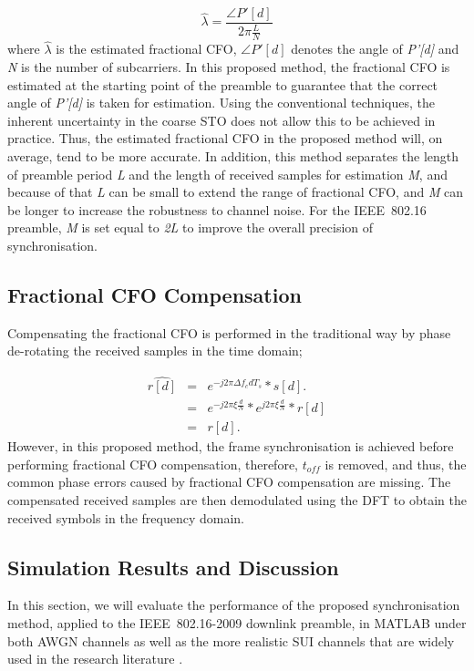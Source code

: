 \begin{equation}
\label{proposedfractionalCFO}
\hat{\lambda} = \frac{\angle P'[d]}{2\pi \frac{L}{N}}
\end{equation}
where $\hat{\lambda}$ is the estimated fractional CFO, $\angle P'[d]$ denotes the angle of \emph{P'[d]} and \emph{N} is the number of subcarriers.
In this proposed method, the fractional CFO is estimated at the starting point of the preamble to guarantee that the correct angle of \emph{P'[d]} is taken for estimation. Using the conventional techniques, the inherent uncertainty in the coarse STO does not allow this to be achieved in practice.
Thus, the estimated fractional CFO in the proposed method will, on average, tend to be more accurate.
In addition, this method separates the length of preamble period \emph{L} and the length of received samples for estimation \emph{M}, and because of that \emph{L} can be small to extend the range of fractional CFO, and \emph{M} can be longer to increase the robustness to channel noise. For the IEEE~802.16 preamble, \emph{M} is set equal to \emph{2L} to improve the overall precision of synchronisation.

\subsection{Fractional CFO Compensation} 

Compensating the fractional CFO is performed in the traditional way by phase de-rotating the received samples in the time domain;

\begin{eqnarray}
\label{proposedcomfreoffsignal}
\widehat{r[d]} &=&  e^{-j2\pi\Delta f_{c}dT_{s}}*s[d]. \nonumber \\
&=&  e^{-j2\pi\xi \frac{d}{N}}*e^{j2\pi\xi \frac{d}{N}}*r[d] \nonumber \\
&=& r[d].
\end{eqnarray}
However, in this proposed method, the frame synchronisation is achieved before performing fractional CFO compensation, therefore, $t_{off}$ is removed, and thus, the common phase errors caused by fractional CFO compensation are missing. 
The compensated received samples are then demodulated using the DFT to obtain the received symbols in the frequency domain.

\subsection{Simulation Results and Discussion}
In this section, we will evaluate the performance of the proposed synchronisation method, applied to the IEEE~802.16-2009 downlink preamble, in MATLAB under both AWGN channels as well as the more realistic SUI channels that are widely used in the research literature \cite{Kishore2006,Kim2008}.

